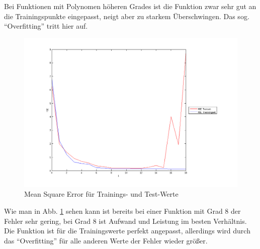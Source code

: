 Bei Funktionen mit Polynomen höheren Grades ist die Funktion zwar sehr gut an die Trainingspunkte eingepasst, neigt aber zu starkem Überschwingen.
Das sog. ``Overfitting'' tritt hier auf.


\begin{figure}[hp!]
\begin{center}
 \includegraphics[width=1\textwidth]{./figures/1_1_1_MSE}
 \caption[Mean Square Error]{Mean Square Error für Trainings- und Test-Werte}
\label{fig:MSE}
\end{center}
\end{figure}

Wie man in Abb. \ref{fig:MSE} sehen kann ist bereits bei einer Funktion mit Grad 8 der Fehler sehr gering, bei Grad 8 ist  
Aufwand und Leistung im besten Verhältnis. Die Funktion ist für die Trainingswerte 
perfekt angepasst, allerdings wird durch das ``Overfitting'' für alle anderen Werte der Fehler wieder größer.
